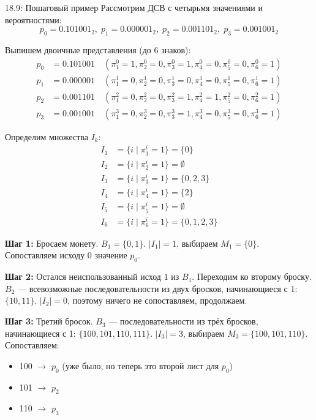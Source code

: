 \documentclass[a4paper,12pt]{article}
\begin{document}
	\begin{examplebox}{18.9: Пошаговый пример}
		Рассмотрим ДСВ с четырьмя значениями и вероятностями:
		\[ p_0 = 0.101001_2, \; p_1 = 0.000001_2, \; p_2 = 0.001101_2, \; p_3 = 0.001001_2 \]
		
		Выпишем двоичные представления (до 6 знаков):
		\begin{align*}
			p_0 &= 0.101001 \quad (\pi_1^0=1, \pi_2^0=0, \pi_3^0=1, \pi_4^0=0, \pi_5^0=0, \pi_6^0=1) \\
			p_1 &= 0.000001 \quad (\pi_1^1=0, \pi_2^1=0, \pi_3^1=0, \pi_4^1=0, \pi_5^1=0, \pi_6^1=1) \\
			p_2 &= 0.001101 \quad (\pi_1^2=0, \pi_2^2=0, \pi_3^2=1, \pi_4^2=1, \pi_5^2=0, \pi_6^2=1) \\
			p_3 &= 0.001001 \quad (\pi_1^3=0, \pi_2^3=0, \pi_3^3=1, \pi_4^3=0, \pi_5^3=0, \pi_6^3=1)
		\end{align*}
		
		Определим множества \(I_k\):
		\begin{align*}
			I_1 &= \{ i \mid \pi_1^i = 1 \} = \{0\} \\
			I_2 &= \{ i \mid \pi_2^i = 1 \} = \emptyset \\
			I_3 &= \{ i \mid \pi_3^i = 1 \} = \{0, 2, 3\} \\
			I_4 &= \{ i \mid \pi_4^i = 1 \} = \{2\} \\
			I_5 &= \{ i \mid \pi_5^i = 1 \} = \emptyset \\
			I_6 &= \{ i \mid \pi_6^i = 1 \} = \{0, 1, 2, 3\}
		\end{align*}
		
		\textbf{Шаг 1:} Бросаем монету. \(B_1 = \{0, 1\}\). \(|I_1| = 1\), выбираем \(M_1 = \{0\}\). Сопоставляем исходу 0 значение \(p_0\).
		
		\textbf{Шаг 2:} Остался неиспользованный исход \(1\) из \(B_1\). Переходим ко второму броску. \(B_2\) — всевозможные последовательности из двух бросков, начинающиеся с 1: \(\{10, 11\}\). \(|I_2| = 0\), поэтому ничего не сопоставляем, продолжаем.
		
		\textbf{Шаг 3:} Третий бросок. \(B_3\) — последовательности из трёх бросков, начинающиеся с 1: \(\{100, 101, 110, 111\}\). \(|I_3| = 3\), выбираем \(M_3 = \{100, 101, 110\}\). Сопоставляем:
		\begin{itemize}
			\item 100 \(\to\) \(p_0\) (уже было, но теперь это второй лист для \(p_0\))
			\item 101 \(\to\) \(p_2\)
			\item 110 \(\to\) \(p_3\)
		\end{itemize}
		

\end{examplebox}
\end{document}
